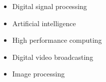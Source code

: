 \begin{itemize}
	\item Digital signal processing
	\item Artificial intelligence
	\item High performance computing
	\item Digital video broadcasting
	\item Image processing
	      \\
\end{itemize}

